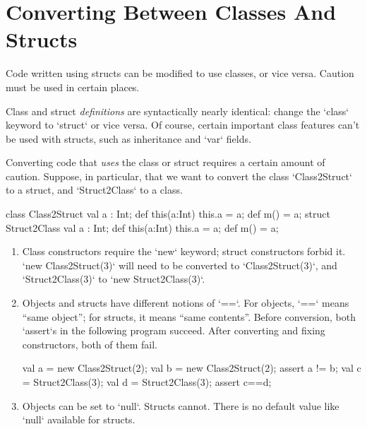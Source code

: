 \section{Converting Between Classes And Structs}

Code written using structs can be modified to use classes, or vice versa.
Caution must be used in certain places. 

Class and struct {\em definitions} are syntactically nearly identical:
change the \xcd`class` keyword to \xcd`struct` or vice versa.  Of course,
certain important class features can't be used with structs, such as
inheritance and \xcd`var` fields. 

Converting code that {\em uses} the class or struct requires a certain amount
of caution.
Suppose, in particular, that we want to convert the class \xcd`Class2Struct`
to a struct, and \xcd`Struct2Class` to a class.
\begin{xten}
class Class2Struct {
  val a : Int;
  def this(a:Int) { this.a = a; }
  def m() = a;
}
struct Struct2Class { 
  val a : Int;
  def this(a:Int) { this.a = a; }
  def m() = a;
}
\end{xten}
%

\begin{enumerate}

\item Class constructors require the \xcd`new` keyword; struct constructors
      forbid it.  \xcd`new Class2Struct(3)` will need to be converted to
      \xcd`Class2Struct(3)`, and \xcd`Struct2Class(3)` to 
      \xcd`new Struct2Class(3)`.

\item Objects and structs have different notions of \xcd`==`.  
      For objects, \xcd`==` means ``same object''; for structs, it means
      ``same contents''. Before conversion, both \xcd`assert`s in the
      following program succeed.  After converting and fixing constructors,
      both of them fail.
\begin{xten}
val a = new Class2Struct(2);
val b = new Class2Struct(2);
assert a != b;
val c = Struct2Class(3);
val d = Struct2Class(3);
assert c==d;
\end{xten}

\item Objects can be set to \xcd`null`.  Structs cannot.  There is no
      default value like \xcd`null` available for structs.  


\end{enumerate}
